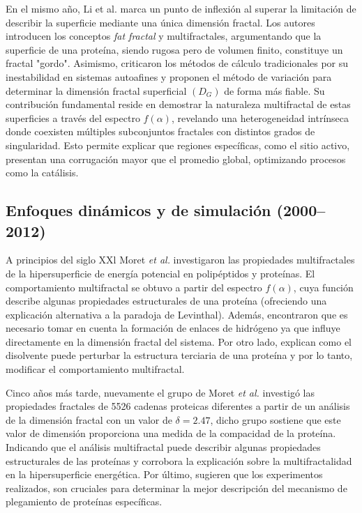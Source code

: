 En el mismo año, Li et al. \cite{HouqiangLi1991} marca un punto de inflexión al superar la limitación de describir la superficie mediante una única dimensión fractal. Los autores introducen los conceptos \textit{fat fractal} y multifractales, argumentando que la superficie de una proteína, siendo rugosa pero de volumen finito, constituye un fractal "gordo". Asimismo, criticaron los métodos de cálculo tradicionales por su inestabilidad en sistemas autoafines y proponen el método de variación para determinar la dimensión fractal superficial $(D_G)$ de forma más fiable. Su contribución fundamental reside en demostrar la naturaleza multifractal de estas superficies a través del espectro $f(\alpha)$, revelando una heterogeneidad intrínseca donde coexisten múltiples subconjuntos fractales con distintos grados de singularidad. Esto permite explicar que regiones específicas, como el sitio activo, presentan una corrugación mayor que el promedio global, optimizando procesos como la catálisis. 

\subsection{Enfoques dinámicos y de simulación (2000--2012)}


A principios del siglo XXl Moret \textit{et al.}\cite{Moret2001} investigaron las propiedades multifractales de la hipersuperficie de energía potencial en polipéptidos y proteínas. El comportamiento multifractal se obtuvo a partir del espectro $f(\alpha)$, cuya función describe algunas propiedades estructurales de una proteína (ofreciendo una explicación alternativa a la paradoja de Levinthal). Además, encontraron que es necesario tomar en cuenta la formación de enlaces de hidrógeno ya que influye directamente en la dimensión fractal del sistema. Por otro lado, explican como el disolvente puede perturbar la estructura terciaria de una proteína y por lo tanto, modificar el comportamiento multifractal.

Cinco años más tarde, nuevamente el grupo de Moret \textit{et al.} \cite{Moret2005} investigó las propiedades fractales de 5526 cadenas proteicas diferentes a partir de un análisis de la dimensión fractal con un valor de $\delta = 2.47$, dicho grupo sostiene que este valor de dimensión proporciona una medida de la compacidad de la proteína. Indicando que el análisis multifractal puede describir algunas propiedades estructurales de las proteínas y corrobora la explicación sobre la multifractalidad en la hipersuperficie energética. Por último, sugieren que los experimentos realizados, son cruciales para determinar la mejor descripción del mecanismo de plegamiento de proteínas específicas.

